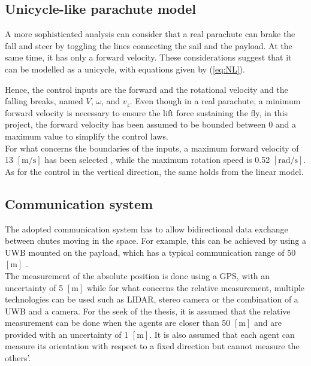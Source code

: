 \subsection{Unicycle-like parachute model} \label{unicyle}
A more sophisticated analysis can consider that a real parachute can brake the fall and steer by toggling the lines connecting the sail and the payload. At the same time, it has only a forward velocity. These considerations suggest that it can be modelled as a unicycle, with equations given by (\ref{eq:NL}).

Hence, the control inputs are the forward and the rotational velocity and the falling breaks, named $V$, $\omega$, and $v_z$.
Even though in a real parachute, a minimum forward velocity is necessary to ensure the lift force sustaining the fly, in this project, the forward velocity has been assumed to be bounded between 0 and a maximum value to simplify the control laws.\\
For what concerns the boundaries of the inputs, a maximum forward velocity of 13 $\left[\si{\meter\per\second}\right]$ has been selected \cite{b7} \cite{b10}, while the maximum rotation speed is 0.52 $\left[\si{\radian\per\second}\right]$. As for the control in the vertical direction, the same holds from the linear model.

\subsection{Communication system}\label{communication}
The adopted communication system has to allow bidirectional data exchange between chutes moving in the space. For example, this can be achieved by using a UWB mounted on the payload, which has a typical communication range of 50 $\left[\si{\meter}\right]$ \cite{b11}.\\
The measurement of the absolute position is done using a GPS, with an uncertainty of 5 $\left[\si{\meter}\right]$ while for what concerns the relative measurement, multiple technologies can be used such as LIDAR, stereo camera or the combination of a UWB and a camera. For the seek of the thesis, it is assumed that the relative measurement can be done when the agents are closer than 50 $\left[\si{\meter}\right]$ and are provided with an uncertainty of 1 $\left[\si{\meter}\right]$. It is also assumed that each agent can measure its orientation with respect to a fixed direction but cannot measure the others'.